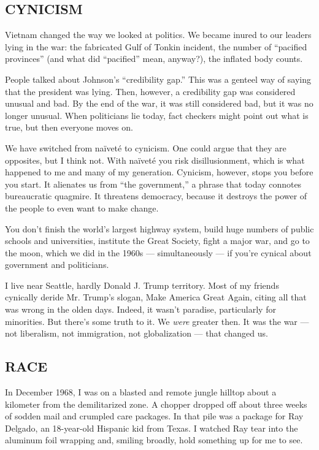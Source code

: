 \hypertarget{cynicism}{%
\subsection{\texorpdfstring{\textbf{CYNICISM}}{CYNICISM}}\label{cynicism}}

Vietnam changed the way we looked at politics. We became inured to our
leaders lying in the war: the fabricated Gulf of Tonkin incident, the
number of ``pacified provinces'' (and what did ``pacified'' mean,
anyway?), the inflated body counts.

People talked about Johnson's ``credibility gap.'' This was a genteel
way of saying that the president was lying. Then, however, a credibility
gap was considered unusual and bad. By the end of the war, it was still
considered bad, but it was no longer unusual. When politicians lie
today, fact checkers might point out what is true, but then everyone
moves on.

We have switched from naïveté to cynicism. One could argue that they are
opposites, but I think not. With naïveté you risk disillusionment, which
is what happened to me and many of my generation. Cynicism, however,
stops you before you start. It alienates us from ``the government,'' a
phrase that today connotes bureaucratic quagmire. It threatens
democracy, because it destroys the power of the people to even want to
make change.

You don't finish the world's largest highway system, build huge numbers
of public schools and universities, institute the Great Society, fight a
major war, and go to the moon, which we did in the 1960s ---
simultaneously --- if you're cynical about government and politicians.

I live near Seattle, hardly Donald J. Trump territory. Most of my
friends cynically deride Mr. Trump's slogan, Make America Great Again,
citing all that was wrong in the olden days. Indeed, it wasn't paradise,
particularly for minorities. But there's some truth to it. We
\emph{were} greater then. It was the war --- not liberalism, not
immigration, not globalization --- that changed us.

\hypertarget{race}{%
\subsection{\texorpdfstring{\textbf{RACE}}{RACE}}\label{race}}

In December 1968, I was on a blasted and remote jungle hilltop about a
kilometer from the demilitarized zone. A chopper dropped off about three
weeks of sodden mail and crumpled care packages. In that pile was a
package for Ray Delgado, an 18-year-old Hispanic kid from Texas. I
watched Ray tear into the aluminum foil wrapping and, smiling broadly,
hold something up for me to see.

